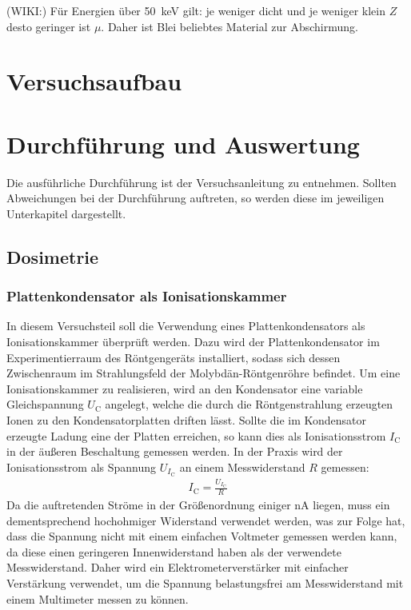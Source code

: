 \documentclass[11pt, a4paper]{article}
\numberwithin{equation}{section}
\begin{document}
(WIKI:) Für Energien über \SI{50}{keV} gilt:
je weniger dicht und je weniger klein $Z$ desto geringer ist $\mu$. Daher ist Blei beliebtes Material zur Abschirmung.

\section{Versuchsaufbau}

\section{Durchführung und Auswertung}
Die ausführliche Durchführung ist der Versuchsanleitung \cite{anleitung} zu entnehmen.
Sollten Abweichungen bei der Durchführung auftreten, so werden diese im jeweiligen Unterkapitel dargestellt.

\subsection{Dosimetrie}

\subsubsection{Plattenkondensator als Ionisationskammer}
In diesem Versuchsteil soll die Verwendung eines Plattenkondensators als Ionisationskammer überprüft werden.
Dazu wird der Plattenkondensator im Experimentierraum des Röntgengeräts installiert, sodass sich dessen Zwischenraum im Strahlungsfeld der Molybdän-Röntgenröhre befindet.
Um eine Ionisationskammer zu realisieren, wird an den Kondensator eine variable Gleichspannung $U_\mathrm{C}$ angelegt, welche die durch die Röntgenstrahlung erzeugten Ionen zu den Kondensatorplatten driften lässt.
Sollte die im Kondensator erzeugte Ladung eine der Platten erreichen, so kann dies als Ionisationsstrom $I_\mathrm{C}$ in der äußeren Beschaltung gemessen werden.
In der Praxis wird der Ionisationsstrom als Spannung $U_{I_\mathrm{C}}$ an einem Messwiderstand $R$ gemessen:
\begin{align}
	I_\mathrm{C} = \frac{U_{I_\mathrm{C}}}{R}
	\label{eq:ohm_ionisationsstrom}
\end{align}
Da die auftretenden Ströme in der Größenordnung einiger \si{nA} liegen, muss ein dementsprechend hochohmiger Widerstand verwendet werden, was zur Folge hat, dass die Spannung nicht mit einem einfachen Voltmeter gemessen werden kann, da diese einen geringeren Innenwiderstand haben als der verwendete Messwiderstand.
Daher wird ein Elektrometerverstärker mit einfacher Verstärkung verwendet, um die Spannung belastungsfrei am Messwiderstand mit einem Multimeter messen zu können.
\end{document}
